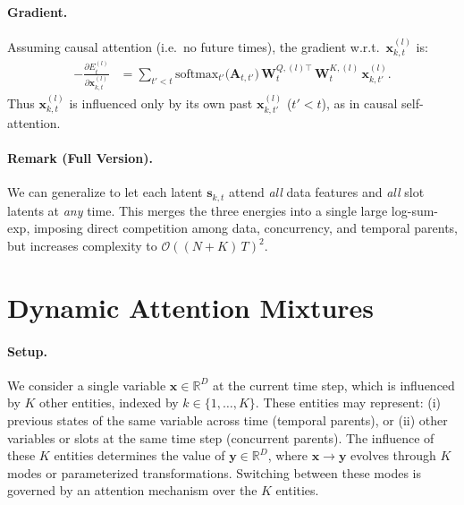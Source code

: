 \documentclass{article}
\begin{document}
\paragraph{Gradient.}
Assuming causal attention (i.e.\ no future times), the gradient w.r.t.\ \(\bm{x}_{k,t}^{(l)}\) is:
\begin{equation}
\begin{aligned}
-\frac{\partial E_{t}^{(l)}}{\partial \bm{x}_{k,t}^{(l)}}
&=
\sum_{t'<t}
\mathrm{softmax}_{t'}\bigl(\bm{A}_{t,t'}\bigr)\,
\bm{W}_{t}^{Q,(l)\top}\,\bm{W}_{t}^{K,(l)}\,\bm{x}_{k,t'}^{(l)}.
\end{aligned}
\end{equation}
Thus \(\bm{x}_{k,t}^{(l)}\) is influenced only by its own past \(\bm{x}_{k,t'}^{(l)}\) (\(t'<t\)), as in causal self-attention.



\paragraph{Remark (Full Version).}
We can generalize to let each latent \(\bm{s}_{k,t}\) attend \emph{all} data features and \emph{all} slot latents at \emph{any} time.  This merges the three energies into a single large log-sum-exp, imposing direct competition among data, concurrency, and temporal parents, but increases complexity to \(\mathcal{O}((N + K)\,T)^2\). 


\section{Dynamic Attention Mixtures}

\paragraph{Setup.} 
We consider a single variable \(\bm{x} \in \mathbb{R}^D\) at the current time step, which is influenced by \(K\) other entities, indexed by \(k \in \{1, \dots, K\}\). These entities may represent:
(i) previous states of the same variable across time (temporal parents), or 
(ii) other variables or slots at the same time step (concurrent parents). 
The influence of these \(K\) entities determines the value of \(\bm{y} \in \mathbb{R}^D\), where \(\bm{x} \to \bm{y}\) evolves through \(K\) modes or parameterized transformations. Switching between these modes is governed by an attention mechanism over the \(K\) entities.
\end{document}
